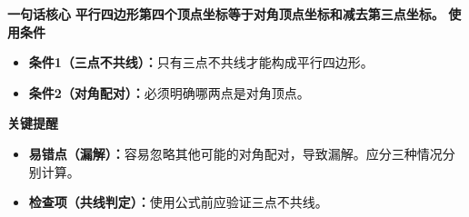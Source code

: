 \begin{summarybox}
	\textbf{\textcolor{CSummary}{一句话核心}}
	\textbf{平行四边形第四个顶点坐标等于对角顶点坐标和减去第三点坐标。}
	\medskip
	\textbf{\textcolor{CSummary}{使用条件}}
	\begin{itemize}[leftmargin=*, itemsep=0.5em, topsep=0.4em]
		\item \textbf{条件1（三点不共线）：}只有三点不共线才能构成平行四边形。
		\item \textbf{条件2（对角配对）：}必须明确哪两点是对角顶点。
	\end{itemize}
	\medskip
	\textbf{\textcolor{CSummary}{关键提醒}}
	\begin{itemize}[leftmargin=*, itemsep=0.5em, topsep=0.4em]
		\item \textbf{易错点（漏解）：}容易忽略其他可能的对角配对，导致漏解。应分三种情况分别计算。
		\item \textbf{检查项（共线判定）：}使用公式前应验证三点不共线。
	\end{itemize}
\end{summarybox}
